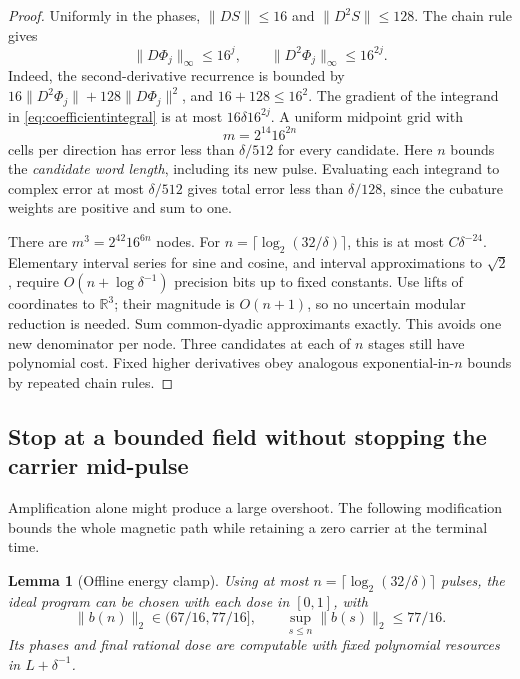 \documentclass[11pt,a4paper]{amsart}
\newtheorem{lemma}[theorem]{Lemma}
\theoremstyle{definition}
\theoremstyle{remark}
\numberwithin{equation}{section}
\newcommand{\R}{\mathbb R}
\newcommand{\norm}[1]{\lVert #1\rVert}
\begin{document}
\begin{proof}
Uniformly in the phases, $\norm{DS}\le16$ and $\norm{D^2S}\le128$. The chain rule gives
\begin{equation}\label{eq:mapbounds}
 \norm{D\Phi_j}_\infty\le16^j,\qquad
 \norm{D^2\Phi_j}_\infty\le16^{2j}.
\end{equation}
Indeed, the second-derivative recurrence is bounded by
$16\norm{D^2\Phi_j}+128\norm{D\Phi_j}^2$, and $16+128\le16^2$.
The gradient of the integrand in \eqref{eq:coefficientintegral} is at most $16\delta16^{2j}$. A uniform midpoint grid with
\[
 m=2^{14}16^{2n}
\]
cells per direction has error less than $\delta/512$ for every candidate. Here $n$ bounds the \emph{candidate word length}, including its new pulse. Evaluating each integrand to complex error at most $\delta/512$ gives total error less than $\delta/128$, since the cubature weights are positive and sum to one.

There are $m^3=2^{42}16^{6n}$ nodes. For $n=\lceil\log_2(32/\delta)\rceil$, this is at most $C\delta^{-24}$. Elementary interval series for sine and cosine, and interval approximations to $\sqrt2$, require $O(n+\log\delta^{-1})$ precision bits up to fixed constants. Use lifts of coordinates to $\R^3$; their magnitude is $O(n+1)$, so no uncertain modular reduction is needed. Sum common-dyadic approximants exactly. This avoids one new denominator per node. Three candidates at each of $n$ stages still have polynomial cost. Fixed higher derivatives obey analogous exponential-in-$n$ bounds by repeated chain rules.
\end{proof}

\subsection{Stop at a bounded field without stopping the carrier mid-pulse}
Amplification alone might produce a large overshoot. The following modification bounds the whole magnetic path while retaining a zero carrier at the terminal time.

\begin{lemma}[Offline energy clamp]\label{lem:clamp}
Using at most $n=\lceil\log_2(32/\delta)\rceil$ pulses, the ideal program can be chosen with each dose in $[0,1]$, with
\begin{equation}\label{eq:clampbounds}
 \norm{b(n)}_2\in(67/16,77/16],\qquad
 \sup_{s\le n}\norm{b(s)}_2\le77/16.
\end{equation}
Its phases and final rational dose are computable with fixed polynomial resources in $L+\delta^{-1}$.
\end{lemma}
\end{document}
